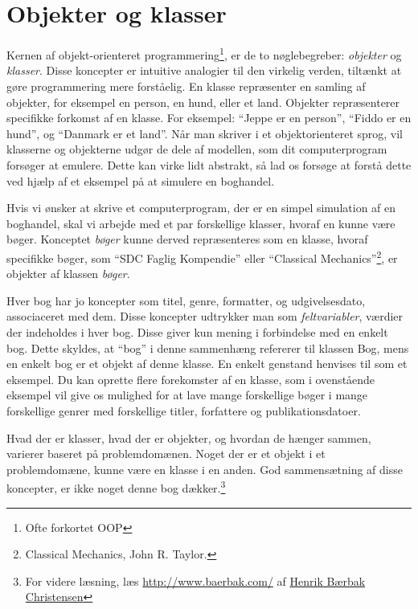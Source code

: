 
\newcommand\sillynote[1]{\footnote{#1}}
\newcommand\importantnote[1]{\begin{remark} #1 \end{remark}}
\newcommand\referencenote[1]{\footnote{#1}}

\chapter{Objekter og klasser}

Kernen af objekt-orienteret programmering\sillynote{Ofte forkortet OOP},
er de to nøglebegreber: \emph{objekter} og \emph{klasser}. Disse
koncepter er intuitive analogier til den virkelig verden, tiltænkt at
gøre programmering mere forståelig. En klasse repræsenter en samling
af objekter, for eksempel en person, en hund, eller et land. Objekter
repræsenterer specifikke forkomst af en klasse. For eksempel: ``Jeppe
er en person'', ``Fiddo er en hund'', og ``Danmark er et land''.
Når man skriver i et objektorienteret sprog, vil klasserne og
objekterne udgør de dele af modellen, som dit computerprogram forsøger
at emulere. Dette kan virke lidt abstrakt, så lad os forsøge at forstå
dette ved hjælp af et eksempel på at simulere en boghandel.

\begin{example}
    Hvis vi ønsker at skrive et computerprogram, der er en simpel
    simulation af en boghandel, skal vi arbejde med et par forskellige
    klasser, hvoraf en kunne være bøger. Konceptet \emph{bøger} kunne
    derved repræsenteres som en klasse, hvoraf specifikke bøger, som
    ``SDC Faglig Kompendie'' eller ``Classical
    Mechanics''\sillynote{Classical Mechanics, John R. Taylor.}, er
    objekter af klassen \emph{bøger}.

    Hver bog har jo koncepter som titel, genre, formatter, og
    udgivelsesdato, associaceret med dem. Disse koncepter udtrykker
    man som \emph{feltvariabler}, værdier der indeholdes i hver bog.
    Disse giver kun mening i forbindelse med en enkelt bog. Dette
    skyldes, at ``bog'' i denne sammenhæng refererer til klassen Bog,
    mens en enkelt bog er et objekt af denne klasse.  En enkelt
    genstand henvises til som et eksempel. Du kan oprette flere
    forekomster af en klasse, som i ovenstående eksempel vil give os
    mulighed for at lave mange forskellige bøger i mange forskellige
    genrer med forskellige titler, forfattere og publikationsdatoer.
\end{example}

\importantnote{Hvad der er klasser, hvad der er objekter, og hvordan
de hænger sammen, varierer baseret på problemdomænen. Noget der er et
objekt i et problemdomæne, kunne være en klasse i en anden. God
sammensætning af disse koncepter, er ikke noget denne bog
dækker.\referencenote{For videre læsning, læs
\href{Flexible, Reliable Software}{http://www.baerbak.com/} af
\href{http://pure.au.dk/portal/da/hbc@cs.au.dk}{Henrik Bærbak Christensen}}}

